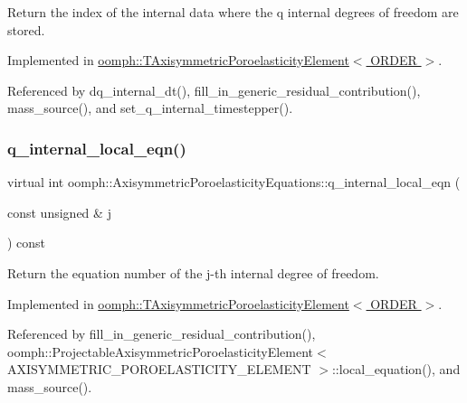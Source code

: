 Return the index of the internal data where the q internal degrees of freedom are stored. 



Implemented in \hyperlink{classoomph_1_1TAxisymmetricPoroelasticityElement_a53999a350be9bf4320a19750dd85e71b}{oomph\+::\+T\+Axisymmetric\+Poroelasticity\+Element$<$ O\+R\+D\+E\+R $>$}.



Referenced by dq\+\_\+internal\+\_\+dt(), fill\+\_\+in\+\_\+generic\+\_\+residual\+\_\+contribution(), mass\+\_\+source(), and set\+\_\+q\+\_\+internal\+\_\+timestepper().

\mbox{\label{classoomph_1_1AxisymmetricPoroelasticityEquations_a310a9bba22acd741c86d3e67940b5935}} 
\subsubsection{\texorpdfstring{q\+\_\+internal\+\_\+local\+\_\+eqn()}{q\_internal\_local\_eqn()}}
{\footnotesize\ttfamily virtual int oomph\+::\+Axisymmetric\+Poroelasticity\+Equations\+::q\+\_\+internal\+\_\+local\+\_\+eqn (\begin{DoxyParamCaption}\item[{const unsigned \&}]{j }\end{DoxyParamCaption}) const\hspace{0.3cm}{\ttfamily [pure virtual]}}



Return the equation number of the j-\/th internal degree of freedom. 



Implemented in \hyperlink{classoomph_1_1TAxisymmetricPoroelasticityElement_ae13e181da7a330ebe62cc51d50584942}{oomph\+::\+T\+Axisymmetric\+Poroelasticity\+Element$<$ O\+R\+D\+E\+R $>$}.



Referenced by fill\+\_\+in\+\_\+generic\+\_\+residual\+\_\+contribution(), oomph\+::\+Projectable\+Axisymmetric\+Poroelasticity\+Element$<$ A\+X\+I\+S\+Y\+M\+M\+E\+T\+R\+I\+C\+\_\+\+P\+O\+R\+O\+E\+L\+A\+S\+T\+I\+C\+I\+T\+Y\+\_\+\+E\+L\+E\+M\+E\+N\+T $>$\+::local\+\_\+equation(), and mass\+\_\+source().

